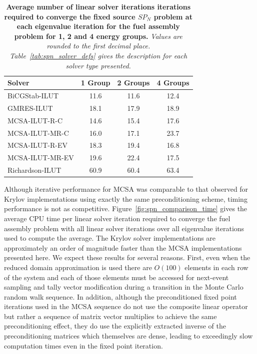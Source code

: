\documentclass[letterpaper,11pt]{article}
\begin{document}
\begin{table}[h!]
  \begin{center}
    \begin{tabular}{lccc}\hline\hline
      \multicolumn{1}{l}{Solver}&
      \multicolumn{1}{c}{1 Group}&
      \multicolumn{1}{c}{2 Groups}&
      \multicolumn{1}{c}{4 Groups}\\
      \hline
      BiCGStab-ILUT & 11.6 & 11.6 & 12.4 \\ 
      GMRES-ILUT & 18.1 & 17.9 & 18.9 \\
      MCSA-ILUT-R-C & 14.6 & 15.4 & 17.6 \\
      MCSA-ILUT-MR-C & 16.0 & 17.1 & 23.7 \\
      MCSA-ILUT-R-EV & 18.3 & 19.4 & 16.8 \\
      MCSA-ILUT-MR-EV & 19.6 & 22.4 & 17.5 \\
      Richardson-ILUT & 60.9 & 60.4 & 63.4 \\
      \hline\hline
    \end{tabular}
  \end{center}
  \caption{\textbf{Average number of linear solver iterations
      iterations required to converge the fixed source $SP_N$ problem
      at each eigenvalue iteration for the fuel assembly problem for
      1, 2 and 4 energy groups.} \textit{Values are rounded to the
      first decimal place. Table~\ref{tab:spn_solver_defs} gives the
      description for each solver type presented.}}
  \label{tab:spn_comparison_iterations}
\end{table}

Although iterative performance for MCSA was comparable to that
observed for Krylov implementations using exactly the same
preconditioning scheme, timing performance is not as
competitive. Figure~\ref{fig:spn_comparison_time} gives the average
CPU time per linear solver iteration required to converge the fuel
assembly problem with all linear solver iterations over all eigenvalue
iterations used to compute the average. The Krylov solver
implementations are approximately an order of magnitude faster than
the MCSA implementations presented here. We expect these results for
several reasons. First, even when the reduced domain approximation is
used there are $O(100)$ elements in each row of the system and each of
those elements must be accessed for next-event sampling and tally
vector modification during a transition in the Monte Carlo random walk
sequence. In addition, although the preconditioned fixed point
iterations used in the MCSA sequence do not use the composite linear
operator but rather a sequence of matrix vector multiplies to achieve
the same preconditioning effect, they do use the explicitly extracted
inverse of the preconditioning matrices which themselves are dense,
leading to exceedingly slow computation times even in the fixed point
iteration.
\end{document}
